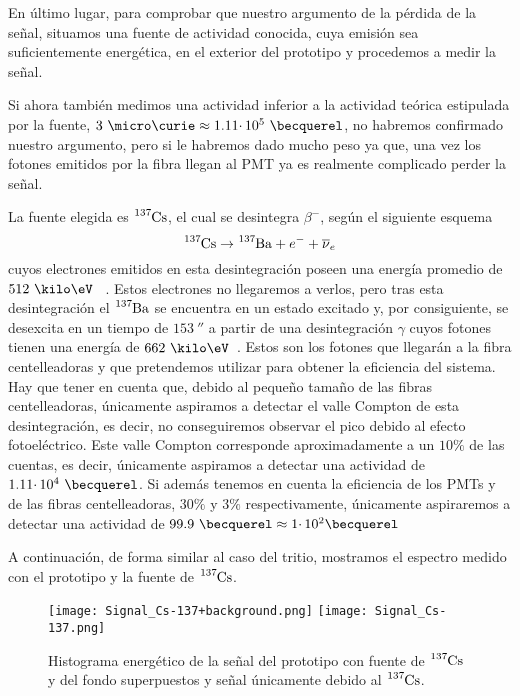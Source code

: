 En último lugar, para comprobar que nuestro argumento de la pérdida de la señal, situamos una fuente de actividad conocida, cuya emisión sea suficientemente energética, en el exterior del prototipo y procedemos a medir la señal. 

Si ahora también medimos una actividad inferior a la actividad teórica estipulada por la fuente, $3~\micro\curie \approx 1.11 \cdotp 10^{5}~\becquerel$, no habremos confirmado nuestro argumento, pero si le habremos dado mucho peso ya que, una vez los fotones emitidos por la fibra llegan al PMT ya es realmente complicado perder la señal. 

La fuente elegida es $\ce{^{137}Cs}$, el cual se desintegra $\beta^{-}$, según el siguiente esquema
\begin{equation}
\ce{^{137}Cs} \rightarrow \ce{^{137}Ba} + e^- + \overline{\nu}_e
\label{desintegracionbeta}
\end{equation}
cuyos electrones emitidos en esta desintegración poseen una energía promedio de $512~\kilo\eV$ ~\cite{Isotopos}. Estos electrones no llegaremos a verlos, pero tras esta desintegración el $\ce{^{137}Ba}$ se encuentra en un estado excitado y, por consiguiente, se desexcita en un tiempo de $153~\second$  a partir de una desintegración $\gamma$ cuyos fotones tienen una energía de $662~\kilo\eV$~\cite{Isotopos}. Estos son los fotones que llegarán a la fibra centelleadoras y que pretendemos utilizar para obtener la eficiencia del sistema. Hay que tener en cuenta que, debido al pequeño tamaño de las fibras centelleadoras, únicamente aspiramos a detectar el valle Compton de esta desintegración, es decir, no conseguiremos observar el pico debido al efecto fotoeléctrico. Este valle Compton corresponde aproximadamente a un $10\%$ de las cuentas, es decir, únicamente aspiramos a detectar una actividad de $1.11 \cdotp 10^{4}~\becquerel$. Si además tenemos en cuenta la eficiencia de los PMTs y de las fibras centelleadoras, $30\%$ y $3\%$ respectivamente, únicamente aspiraremos a detectar una actividad de $99.9~\becquerel \approx 1 \cdotp 10^{2} \becquerel$

A continuación, de forma similar al caso del tritio, mostramos el espectro medido con el prototipo y la fuente de $\ce{^{137}Cs}$.

\begin{figure}[htb]
\centering
{
\texttt{[image: Signal\_Cs-137+background.png]} 
}
{
\texttt{[image: Signal\_Cs-137.png]} 
}
\caption{Histograma energético de la señal del prototipo con fuente de $\ce{^{137}Cs}$ y del fondo superpuestos y señal únicamente debido al $\ce{^{137}Cs}$.\label{senalcesio}}
\end{figure}

